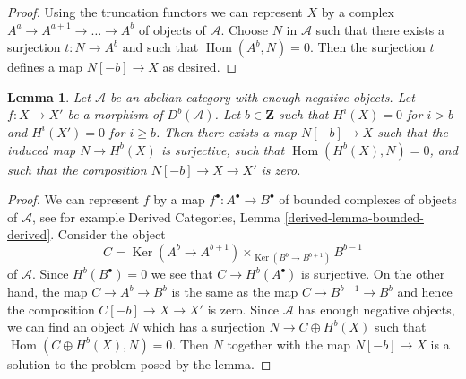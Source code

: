 \documentclass[10pt,a4paper]{amsart}
\theoremstyle{plain}
\newtheorem{lemma}[subsection]{Lemma}
\theoremstyle{definition}
\theoremstyle{remark}
\numberwithin{equation}{subsection}
\def\Hom{\mathop{\mathrm{Hom}}\nolimits}
\def\Ker{\mathop{\mathrm{Ker}}}
\begin{document}
\begin{proof}
Using the truncation functors we can represent $X$ by a complex
$A^a \to A^{a + 1} \to \ldots \to A^b$ of objects of $\mathcal{A}$.
Choose $N$ in $\mathcal{A}$ such that there exists a surjection
$t : N \to A^b$ and such that $\Hom(A^b, N) = 0$. Then the surjection $t$
defines a map $N[-b] \to X$ as desired.
\end{proof}

\begin{lemma}
\label{lemma-good-map-zero}
Let $\mathcal{A}$ be an abelian category with enough negative objects.
Let $f : X \to X'$ be a morphism of $D^b(\mathcal{A})$. Let $b \in \mathbf{Z}$
such that $H^i(X) = 0$ for $i > b$ and $H^i(X') = 0$ for $i \geq b$.
Then there exists a map $N[-b] \to X$ such that the induced map
$N \to H^b(X)$ is surjective, such that $\Hom(H^b(X), N) = 0$, and
such that the composition $N[-b] \to X \to X'$ is zero.
\end{lemma}

\begin{proof}
We can represent $f$ by a map $f^\bullet : A^\bullet \to B^\bullet$
of bounded complexes of objects of $\mathcal{A}$, see for example
Derived Categories, Lemma \ref{derived-lemma-bounded-derived}.
Consider the object
$$
C = \Ker(A^b \to A^{b + 1}) \times_{\Ker(B^b \to B^{b + 1})} B^{b - 1}
$$
of $\mathcal{A}$. Since $H^b(B^\bullet) = 0$ we see that
$C \to H^b(A^\bullet)$ is surjective. On the other hand, the map
$C \to A^b \to B^b$ is the same as the map $C \to B^{b - 1} \to B^b$
and hence the composition $C[-b] \to X \to X'$ is zero.
Since $\mathcal{A}$ has enough negative objects, we can find an object $N$
which has a surjection $N \to C \oplus H^b(X)$ such that
$\Hom(C \oplus H^b(X), N) = 0$. Then $N$ together with the map
$N[-b] \to X$ is a solution to the problem posed by the lemma.
\end{proof}
\end{document}

